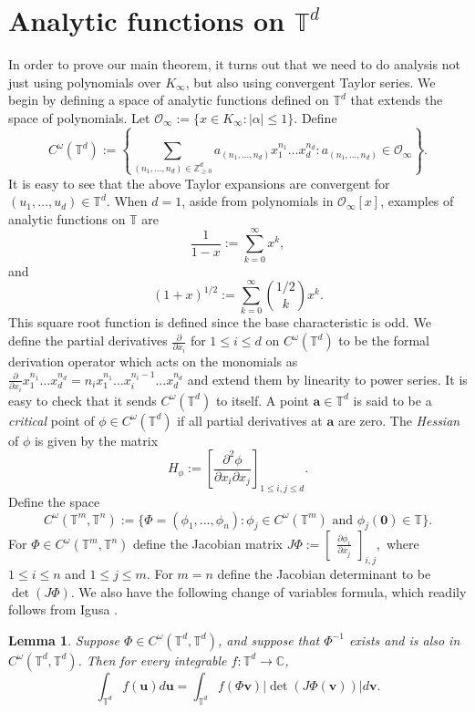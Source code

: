 \documentclass[10pt]{amsart}
\theoremstyle{plain}
\theoremstyle{plain}
\newtheorem{lemma}[theorem]{Lemma}
\renewcommand{\vec}[1]{\mathbf{#1}}
\theoremstyle{remark}
\theoremstyle{definition}
\renewcommand{\hat}{\widehat}
\newcommand{\Ki}{K_\infty}
\newcommand{\CC}{\mathbb{C}}
\newcommand{\TT}{\mathbb{T}}
\newcommand{\cO}{\mathcal{O}}
\begin{document}
\section{Analytic functions on $\TT^d$}\label{analyticsection}
In order to prove our main theorem, it turns out that we need to do analysis not just using polynomials over $\Ki$, but also using  convergent Taylor series. We begin by defining a space of analytic functions defined on $\TT^d$  that extends the space of polynomials. Let  $\cO_{\infty}:=\{x\in K_{\infty}: |\alpha|\leq 1  \}.$ Define
 \[C^{\omega}(\TT^d):=\left\{\sum_{(n_1,\dots,n_d)\in \mathbb{Z}_{\geq 0}^d}a_{(n_1,\dots,n_d)} x_1^{n_1}\dots x_d^{n_d}: a_{(n_1,\dots,n_d)} \in \cO_{\infty} \right\}. \]
It is easy to see that the above Taylor expansions are convergent for $(u_1,\dots,u_d)\in \TT^d.$ 
 When $d=1$, aside from polynomials in $\cO_{\infty}[x]$, examples of analytic functions on $\TT$ are
\[\frac{1}{1-x}:=\sum_{k=0}^{\infty}x^k,\]
and
\[(1+x)^{1/2}:=\sum_{k=0}^{\infty}\binom{1/2}{k}x^k.\]
This square root function is defined since the base characteristic is odd. We define the partial derivatives $\frac{\partial}{\partial x_i}$ for $1 \leq i\leq d$ on $C^{\omega}(\TT^d)$ to be the formal derivation  operator which acts on the monomials as  $\frac{\partial}{\partial x_i} x_1^{n_1}\dots x_d^{n_d}=n_i  x_1^{n_1}\dots x_i^{n_i-1}\dots x_d^{n_d}$ and extend them by linearity to power series. It is easy to check that it sends $C^{\omega}(\TT^d)$  to itself. A point $\vec{a}\in\TT^d$ is said to be a \textit{critical} point of $\phi\in C^{\omega}(\TT^d)$ if all partial derivatives at $\vec{a}$ are zero. The \textit{Hessian} of $\phi$ is given by the matrix
\[H_{\phi}:=\left[\frac{\partial^2\phi}{\partial x_i\partial x_j}\right]_{1\leq i,j\leq d}.\]
Define the space
\[
C^{\omega}(\TT^m,\TT^n):= \{\Phi=(\phi_1,\dots,\phi_n): \phi_j\in C^{\omega}(\TT^m) \text{ and }\phi_j(\vec{0})\in\TT  \}.
\] 
For $\Phi \in C^{\omega}(\TT^m,\TT^n)$ define the Jacobian matrix
\(
J\Phi:=\begin{bmatrix}   
\frac{\partial \phi_i}{\partial x_j} 
\end{bmatrix}_{i,j},
\)
 where $1\leq i\leq n$  and $1\leq j\leq m.$ For $m=n$ define the Jacobian determinant to be $\det (J\Phi).$ We also have the following change of variables formula, which readily follows from Igusa \cite[Proposition 7.4.1]{igusa}.

\begin{lemma}\label{lem:change}
Suppose $\Phi\in C^{\omega}(\TT^d,\TT^d)$, and suppose that $\Phi^{-1}$ exists and is also in $C^{\omega}(\TT^d,\TT^d)$. Then for every integrable $f:\TT^d\rightarrow\mathbb{C}$,
\[\int_{\TT^d}f(\vec{u})d\vec{u}=\int_{\TT^d} f(\Phi\vec{v}) |\det(J\Phi(\vec{v}))|d\vec{v}.\]
\end{lemma}
\end{document}

